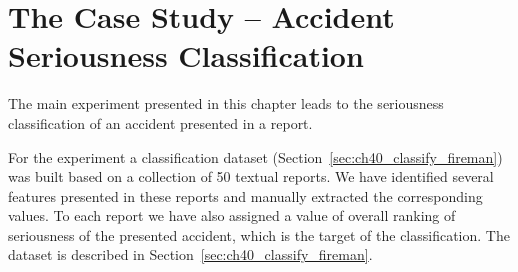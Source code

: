 















\section{The Case Study -- Accident Seriousness Classification} \label{sec:ch80_case}



The main experiment presented in this chapter leads to the seriousness classification of an accident presented in a report. %

For the experiment a classification dataset (Section~\ref{sec:ch40_classify_fireman}) was built based on a collection of 50 textual reports. We have identified several features presented in these reports and manually extracted the corresponding values. To each report we have also assigned a value of overall ranking of seriousness of the presented accident, which is the target of the classification. The dataset is described in Section~\ref{sec:ch40_classify_fireman}. 

